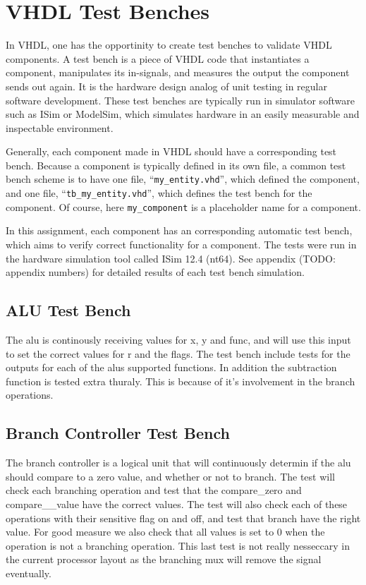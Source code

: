 \section{VHDL Test Benches}

In VHDL, one has the opportinity to create test benches to validate VHDL components.
A test bench is a piece of VHDL code that instantiates a component, manipulates its in-signals, and measures the output the component sends out again.
It is the hardware design analog of unit testing in regular software development.
These test benches are typically run in simulator software such as ISim or ModelSim, which simulates hardware in an easily measurable and inspectable environment.

Generally, each component made in VHDL should have a corresponding test bench.
Because a component is typically defined in its own file, a common test bench scheme is to have one file, ``\texttt{my\_entity.vhd}'', which defined the component, and one file, ``\texttt{tb\_my\_entity.vhd}'', which defines the test bench for the component.
Of course, here \texttt{my\_component} is a placeholder name for a component.

In this assignment, each component has an corresponding automatic test bench, which aims to verify correct functionality for a component.
The tests were run in the hardware simulation tool called ISim 12.4 (nt64).
See appendix (TODO: appendix numbers) for detailed results of each test bench simulation.

\subsection{ALU Test Bench}

The alu is continously receiving values for x, y and func, and will use this input to set the correct values for r and the flags.
The test bench include tests for the outputs for each of the alus supported functions.
In addition the subtraction function is tested extra thuraly.
This is because of it's involvement in the branch operations.

\subsection{Branch Controller Test Bench}

The branch controller is a logical unit that will continuously determin if the alu should compare to a zero value, and whether or not to branch.
The test will check each branching operation and test that the compare\_zero and compare_\zero\_value have the correct values.
The test will also check each of these operations with their sensitive flag on and off, and test that branch have the right value.
For good measure we also check that all values is set to 0 when the operation is not a branching operation.
This last test is not really nesseccary in the current processor layout as the branching mux will remove the signal eventually.

